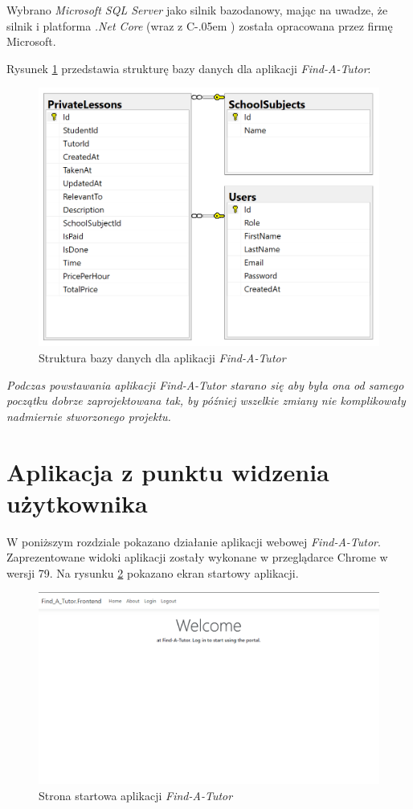 \documentclass[12pt]{article}
\newcommand{\Csharp}{%
  {\settoheight{\dimen0}{C}C\kern-.05em \resizebox{!}{\dimen0}{\raisebox{\depth}{\# }}}}
\numberwithin{figure}{section}
\begin{document}
\begin{sloppypar}
Wybrano \textit{Microsoft SQL Server} jako silnik bazodanowy, mając na uwadze, że silnik i platforma \textit{.Net Core} (wraz z \Csharp) została opracowana przez firmę Microsoft. 
    
Rysunek \ref{fig:db} przedstawia strukturę bazy danych dla aplikacji \textit{Find-A-Tutor}: 
\begin{figure}[H] 
    \centering
    \includegraphics[width=.8\textwidth]{images/chapter_3/db.png}
    \caption{Struktura bazy danych dla aplikacji \textit{Find-A-Tutor}}
    \label{fig:db}
\end{figure}
    
\textit{Podczas powstawania aplikacji Find-A-Tutor starano się aby była ona od samego początku dobrze zaprojektowana tak, by później wszelkie zmiany nie komplikowały nadmiernie stworzonego projektu.}

\newpage
\section{Aplikacja z punktu widzenia użytkownika}
W poniższym rozdziale pokazano działanie aplikacji webowej \textit{Find-A-Tutor}. Zaprezentowane widoki aplikacji zostały wykonane w przeglądarce Chrome w wersji 79. Na rysunku \ref{fig:home} pokazano ekran startowy aplikacji.

\begin{figure}[!htbp] 
    \centering
    \includegraphics[width=1\textwidth]{images/chapter_4/home.png}
    \caption{Strona startowa aplikacji \textit{Find-A-Tutor}}
    \label{fig:home}
\end{figure}


\end{sloppypar}
\end{document}
